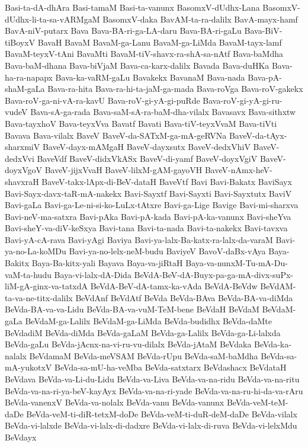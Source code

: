 {Basi-ta-dA-dhAra
Basi-tamaM
Basi-ta-vanunx
BasomxV-dUdhx-Lana
BasomxV-dUdhx-li-ta-sa-vARMgaM
BasomxV-daka
BavAM-ta-ra-dalilx
BavA-mayx-hamf
BavA-niV-putarx
Bava
Bava-BA-ri-ga-LA-daru
Bava-BA-ri-gaLu
Bava-BiV-tiBoyxV
BavaH
BavaM
BavaM-ga-Lanu
BavaM-ga-LiMda
BavaM-tayx-lamf
BavaM-teyxV-tAni
BavaMti
BavaM-tiV-shavx-ra-shA-sa-nAtf
Bava-baMdha
Bava-baM-dhana
Bava-biVjaM
Bava-ca-karx-dalilx
Bavada
Bava-duHKa
Bava-ha-ra-napapx
Bava-ka-vaRM-gaLu
Bavakekx
BavanaM
Bava-nada
Bava-pA-shaM-gaLa
Bava-ra-hita
Bava-ra-hi-ta-jaM-ga-mada
Bava-roVga
Bava-roV-gakekx
Bava-roV-ga-ni-vA-ra-kavU
Bava-roV-gi-yA-gi-puRde
Bava-roV-gi-yA-gi-ru-vudeV
Bava-sA-ga-rada
Bava-saM-sA-ra-baM-dha-vilalx
Bavasavx
Bava-sithxtw
Bava-tayxhoV
Bava-teyxVva
Bavatf
Bavati
Bava-tiV-teyxVvaM
Bava-tiVti
Bavava
Bava-vilalx
BaveV
BaveV-da-SATxM-ga-mA-geRVNa
BaveV-da-tAyx-sharxmiV
BaveV-dayx-mAMgaH
BaveV-dayxsutx
BaveV-dedxVhiV
BaveV-dedxVvi
BaveVdf
BaveV-didxVkASx
BaveV-di-yamf
BaveV-doyxVgiV
BaveV-doyxVgoV
BaveV-jijxVvaH
BaveV-lilxM-gAM-gayoVH
BaveV-nAmx-heV-shavxraH
BaveV-takx-lApx-di-BeV-dataH
BaveVtf
Bavi
Bavi-Bakatx
BaviSayx
Bavi-Sayx-davx-taR-mA-nakekx
Bavi-Sayxtf
Bavi-Sayxti
Bavi-Sayxtutx
BaviV
Bavi-gaLa
Bavi-ga-Le-ni-si-ko-LuLx-tAtxre
Bavi-ga-Lige
Bavige
Bavi-mi-sharxva
Bavi-neV-ma-satxra
Bavi-pAka
Bavi-pA-kada
Bavi-pA-ka-vanunx
Bavi-sheYva
Bavi-sheY-va-diV-keSxya
Bavi-tana
Bavi-ta-nada
Bavi-ta-nakekx
Bavi-tavxva
Bavi-yA-cA-rava
Bavi-yAgi
Baviya
Bavi-ya-lalx-Ba-katx-ra-lalx-da-varaM
Bavi-ya-no-La-koMDu
Bavi-ya-no-lelx-neM-budu
BaviyeV
BavoV-daBx-vAya
Baya-Bakitx
Baya-Ba-kitx-yali
Bayava
Baya-va-jiRtaH
Baya-va-nunxM-Tu-mA-Du-vaM-ta-hudu
Baya-vi-lalx-dA-Dida
BeVdA-BeV-dA-Buyx-pa-ga-mA-divx-suPx-liM-gA-ginx-va-tatxdA
BeVdA-BeV-dA-tamx-ka-vAda
BeVdA-BeVdw
BeVdAM-ta-va-ne-titx-dalilx
BeVdAnf
BeVdAtf
BeVda
BeVda-BAva
BeVda-BA-va-diMda
BeVda-BA-va-va-Lidu
BeVda-BA-va-vuM-TeM-bene
BeVdaH
BeVdaM
BeVdaM-gaLa
BeVdaM-ga-Lalilx
BeVdaM-ga-LiMda
BeVda-budidhx
BeVda-daMte
BeVdadiM
BeVda-diMda
BeVda-gaLaM
BeVda-ga-Lalilx
BeVda-ga-Li-lalxda
BeVda-gaLu
BeVda-jAcnx-na-vi-ru-vu-dilalx
BeVda-jAtaM
BeVdaka
BeVda-ka-nalalx
BeVdamaM
BeVda-meVSAM
BeVda-rUpu
BeVda-saM-baMdha
BeVda-sa-mA-yukotxV
BeVda-sa-mU-ha-veMba
BeVda-satxtarx
BeVdashacx
BeVdataH
BeVdava
BeVda-va-Li-du-Lidu
BeVda-va-Liva
BeVda-va-na-ridu
BeVda-va-na-ritu
BeVda-va-na-ri-ya-beV-kayAyx
BeVda-va-na-ri-yade
BeVda-va-na-ru-hi-da-va-rAru
BeVda-vanenxV
BeVda-va-nolalx
BeVda-vanu
BeVda-vanunx
BeVda-veM-teM-daDe
BeVda-veM-ti-diR-tetxM-doDe
BeVda-veM-ti-duR-deM-daDe
BeVda-vilalx
BeVda-vi-lalxde
BeVda-vi-lalx-di-dadxre
BeVda-vi-lalx-di-ruva
BeVda-vi-lelxMdu
BeVdayx
}
